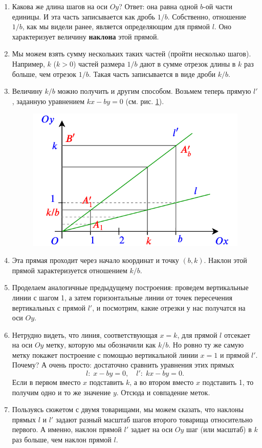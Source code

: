 \begin{enumerate}
\item Какова же длина шагов на оси $Oy$? Ответ: она равна одной $b$-ой части единицы. И эта часть записывается как дробь $1/b$. Собственно, отношение $1/b$, как мы видели ранее, является определяющим для прямой $l$. Оно характеризует величину \textbf{наклона} этой прямой.
\item Мы можем взять сумму нескольких таких частей (пройти несколько шагов). Например, $k$ ($k>0$) частей размера $1/b$ дают в сумме отрезок длины в $k$ раз больше, чем отрезок $1/b$. Такая часть записывается в виде дроби $k/b$.
\item Величину $k/b$ можно получить и другим способом. Возьмем теперь прямую $l'$, заданную уравнением $kx-by=0$ (см. рис. \ref{sectionkb}).
\begin{figure}[htb!]
\begin{center}
\includegraphics[scale=0.5]{sectionkb.png}
\end{center}
\caption{}\label{sectionkb}
\end{figure}
\item Эта прямая проходит через начало координат и точку $(b,k)$. Наклон этой прямой характеризуется отношением $k/b$.
\item Проделаем аналогичные предыдущему построения: проведем вертикальные линии с шагом 1, а затем горизонтальные линии от точек пересечения вертикальных с прямой $l'$, и посмотрим, какие отрезки у нас получатся на оси $Oy$.
\item Нетрудно видеть, что линия, соответствующая $x=k$, для прямой $l$ отсекает на оси $Oy$ метку, которую мы обозначили как $k/b$. Но ровно ту же самую метку покажет построение с помощью вертикальной линии $x=1$ и прямой $l'$. Почему? А очень просто: достаточно сравнить уравнения этих прямых
$$
l:\;x-by=0,\quad l':\;kx-by=0.
$$
Если в первом вместо $x$ подставить $k$, а во втором вместо $x$ подставить 1, то получим одно и то же значение $y$. Отсюда и совпадение меток.
\item Пользуясь сюжетом с двумя товарищами, мы можем сказать, что наклоны прямых $l$ и $l'$ задают разный масштаб шагов второго товарища относительно первого. А именно, наклон прямой $l'$ задает на оси $Oy$ шаг (или масштаб) в $k$ раз больше, чем наклон прямой $l$.


\end{enumerate}
